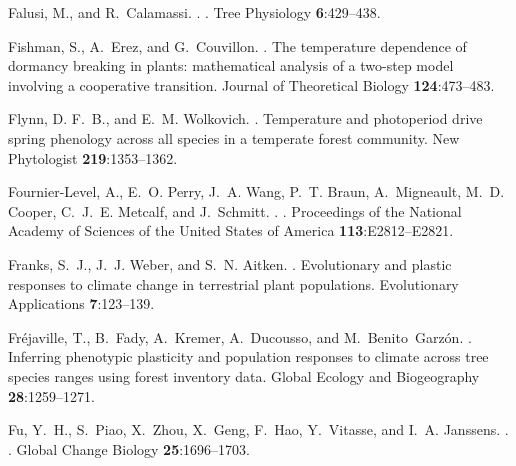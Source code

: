 \documentclass{article}
\begin{document}
\begin{thebibliography}{131}
Falusi, M., and R.~Calamassi.
.
.
\newblock Tree Physiology {\bf 6}:429--438.

Fishman, S., A.~Erez, and G.~Couvillon.
.
\newblock The temperature dependence of dormancy breaking in plants:
  mathematical analysis of a two-step model involving a cooperative transition.
\newblock Journal of Theoretical Biology {\bf 124}:473--483.

Flynn, D. F.~B., and E.~M. Wolkovich.
.
\newblock Temperature and photoperiod drive spring phenology across all species
  in a temperate forest community.
\newblock New Phytologist {\bf 219}:1353--1362.

Fournier-Level, A., E.~O. Perry, J.~A. Wang, P.~T. Braun, A.~Migneault, M.~D.
  Cooper, C.~J.~E. Metcalf, and J.~Schmitt.
.
.
\newblock Proceedings of the National Academy of Sciences of the United States
  of America {\bf 113}:E2812--E2821.

Franks, S.~J., J.~J. Weber, and S.~N. Aitken.
.
\newblock Evolutionary and plastic responses to climate change in terrestrial
  plant populations.
\newblock Evolutionary Applications {\bf 7}:123--139.

Fr{\'e}javille, T., B.~Fady, A.~Kremer, A.~Ducousso, and M.~Benito~Garz{\'o}n.
.
\newblock Inferring phenotypic plasticity and population responses to climate
  across tree species ranges using forest inventory data.
\newblock Global Ecology and Biogeography {\bf 28}:1259--1271.

Fu, Y.~H., S.~Piao, X.~Zhou, X.~Geng, F.~Hao, Y.~Vitasse, and I.~A. Janssens.
.
.
\newblock Global Change Biology {\bf 25}:1696--1703.


\end{thebibliography}
\end{document}
